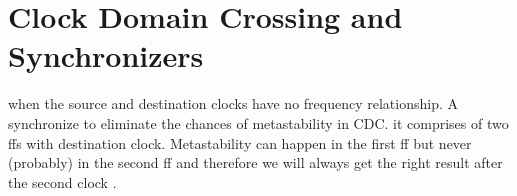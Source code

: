 \section{Clock Domain Crossing and Synchronizers}
when the source and destination clocks have no frequency relationship. A synchronize to eliminate the chances of metastability in CDC. it comprises of two ffs with destination clock. Metastability can happen in the first ff but never (probably) in the second ff and therefore we will always get the right result after the second clock .